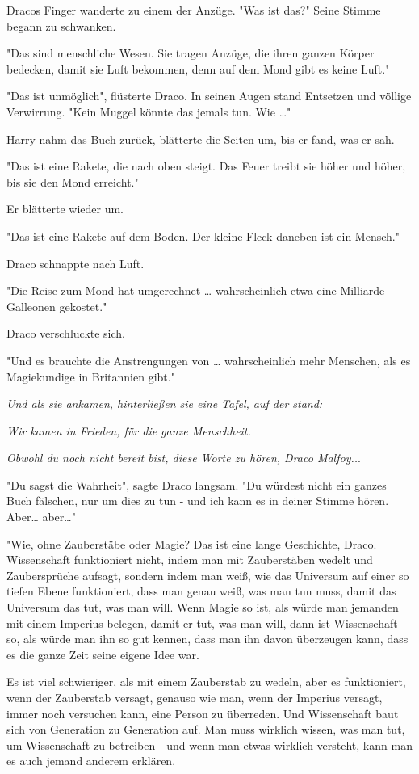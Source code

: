 {Dracos Finger wanderte zu einem der Anzüge. "Was ist das?" Seine Stimme begann zu schwanken.

"Das sind menschliche Wesen. Sie tragen Anzüge, die ihren ganzen Körper bedecken, damit sie Luft bekommen, denn auf dem Mond gibt es keine Luft."

"Das ist unmöglich", flüsterte Draco. In seinen Augen stand Entsetzen und völlige Verwirrung. "Kein Muggel könnte das jemals tun. Wie …"

Harry nahm das Buch zurück, blätterte die Seiten um, bis er fand, was er sah.

"Das ist eine Rakete, die nach oben steigt. Das Feuer treibt sie höher und höher, bis sie den Mond erreicht."

Er blätterte wieder um.

"Das ist eine Rakete auf dem Boden. Der kleine Fleck daneben ist ein Mensch."

Draco schnappte nach Luft.

"Die Reise zum Mond hat umgerechnet … wahrscheinlich etwa eine Milliarde Galleonen gekostet."

Draco verschluckte sich.

"Und es brauchte die Anstrengungen von … wahrscheinlich mehr Menschen, als es Magiekundige in Britannien gibt."

\emph{Und als sie ankamen, hinterließen sie eine Tafel, auf der stand:}

\emph{Wir kamen in Frieden, für die ganze Menschheit.}

\emph{Obwohl du noch nicht bereit bist, diese Worte zu hören, Draco Malfoy..}.

"Du sagst die Wahrheit", sagte Draco langsam. "Du würdest nicht ein ganzes Buch fälschen, nur um dies zu tun - und ich kann es in deiner Stimme hören. Aber… aber…"

"Wie, ohne Zauberstäbe oder Magie? Das ist eine lange Geschichte, Draco. Wissenschaft funktioniert nicht, indem man mit Zauberstäben wedelt und Zaubersprüche aufsagt, sondern indem man weiß, wie das Universum auf einer so tiefen Ebene funktioniert, dass man genau weiß, was man tun muss, damit das Universum das tut, was man will. Wenn Magie so ist, als würde man jemanden mit einem Imperius belegen, damit er tut, was man will, dann ist Wissenschaft so, als würde man ihn so gut kennen, dass man ihn davon überzeugen kann, dass es die ganze Zeit seine eigene Idee war.

Es ist viel schwieriger, als mit einem Zauberstab zu wedeln, aber es funktioniert, wenn der Zauberstab versagt, genauso wie man, wenn der Imperius versagt, immer noch versuchen kann, eine Person zu überreden. Und Wissenschaft baut sich von Generation zu Generation auf. Man muss wirklich wissen, was man tut, um Wissenschaft zu betreiben - und wenn man etwas wirklich versteht, kann man es auch jemand anderem erklären.

}
